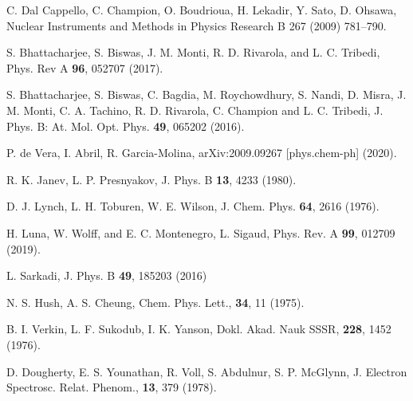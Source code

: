 \begin{thebibliography}{9}

C. Dal Cappello, C. Champion, O. Boudrioua, H. Lekadir, Y. Sato, 
D. Ohsawa, 
Nuclear Instruments and Methods in Physics Research B 267 (2009) 781--790.

S. Bhattacharjee, S. Biswas, J. M. Monti, R. D. Rivarola, and 
L. C. Tribedi,
Phys. Rev A \textbf{96}, 052707 (2017).

S. Bhattacharjee, S. Biswas, C. Bagdia, M. Roychowdhury, S. Nandi, 
D. Misra, J. M. Monti, C. A. Tachino, R. D. Rivarola, C. Champion and 
L. C. Tribedi, J. 
Phys. B: At. Mol. Opt. Phys. \textbf{49},  065202 (2016).

P. de Vera, I. Abril, R. Garcia-Molina,
arXiv:2009.09267 [phys.chem-ph] (2020).


R. K. Janev, L. P. Presnyakov, 
J. Phys. B \textbf{13}, 4233 (1980).

D. J. Lynch, L. H. Toburen, W. E. Wilson,
J. Chem. Phys. \textbf{64}, 2616 (1976).

H. Luna, W. Wolff, and E. C. Montenegro, L. Sigaud, 
Phys. Rev. A \textbf{99}, 012709 (2019).

L. Sarkadi, 
J. Phys. B \textbf{49}, 185203 (2016)

N. S. Hush, A. S. Cheung,  
Chem. Phys. Lett., \textbf{34}, 11 (1975).

B. I. Verkin, L. F. Sukodub, I. K. Yanson, 
Dokl. Akad. Nauk SSSR, \textbf{228}, 1452 (1976).

D. Dougherty, E. S. Younathan, R. Voll, S. Abdulnur, S. P. McGlynn,
J. Electron Spectrosc. Relat. Phenom., \textbf{13}, 379 (1978).


\end{thebibliography}
